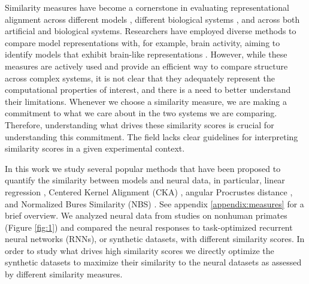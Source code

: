 \documentclass{article} %
\begin{document}
Similarity measures have become a cornerstone in evaluating representational alignment across different models \citep{Kornblith2019}, different biological systems \citep{Kriegeskorte2008}, and across both artificial and biological systems. Researchers have employed diverse methods to compare model representations with, for example, brain activity, aiming to identify models that exhibit brain-like representations \citep{YaminsHong2014, Sussillo2015, SchrimpfKubilius2018, nayebi2018task}. However, while these measures are actively used and provide an efficient way to compare structure across complex systems, it is not clear that they adequately represent the computational properties of interest, and there is a need to better understand their limitations. Whenever we choose a similarity measure, we are making a commitment to what we care about in the two systems we are comparing. Therefore, understanding what drives these similarity scores is crucial for understanding this commitment. The field lacks clear guidelines for interpreting similarity scores in a given experimental context.%


In this work we study several popular methods that have been proposed to quantify the similarity between models and neural data, in particular, linear regression \citep{YaminsHong2014, SchrimpfKubilius2018}, Centered Kernel Alignment (CKA) \citep{Kornblith2019}, angular Procrustes distance \citep{Williams2021, ding2021grounding}, and Normalized Bures Similarity (NBS) \citep{tang2020similarity}. See appendix \ref{appendix:measures} for a brief overview. We analyzed neural data from studies on nonhuman primates (Figure \ref{fig:1}) and compared the neural responses to task-optimized recurrent neural networks (RNNs), or synthetic datasets, with different similarity scores. In order to study what drives high similarity scores we directly optimize the synthetic datasets to maximize their similarity to the neural datasets as assessed by different similarity measures.%
\end{document}
